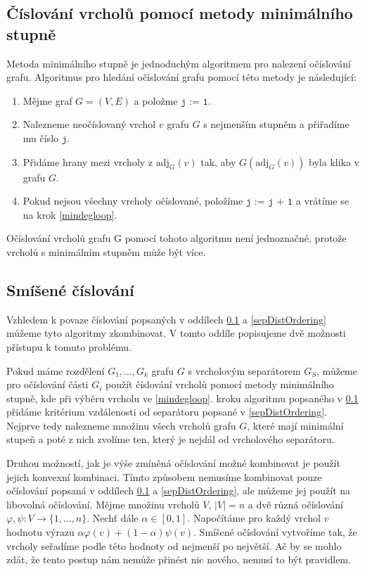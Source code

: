 \documentclass{ctuthesis}
\theoremstyle{plain}
\theoremstyle{definition}
\begin{document}
\subsection{Číslování vrcholů pomocí metody minimálního stupně}
\label{MDordering}
Metoda minimálního stupně je jednoduchým algoritmem pro nalezení očíslování grafu. Algoritmus pro hledání očíslování grafu pomocí této metody je následující:

\begin{enumerate}
  \item Mějme graf $G=(V,E)$ a položme $\texttt{j := 1}$.
  \item \label{mindegloop}
      Nalezneme neočíslovaný vrchol $v$ grafu $G$ s nejmenším stupněm a přiřadíme mu číslo $\texttt{j}$.
  \item Přidáme hrany mezi vrcholy z $\mathrm{adj}_G(v)$ tak, aby $G(\mathrm{adj}_G(v))$ byla klika v grafu $G$.
  \item Pokud nejsou všechny vrcholy očíslované, položíme $\texttt{j := j + 1}$ a vrátíme se na krok \ref{mindegloop}.
\end{enumerate}

Očíslování vrcholů grafu G pomocí tohoto algoritmu není jednoznačné, protože vrcholů s minimálním stupněm může být více.

\subsection{Smíšené číslování}
\label{Mixedordering}
Vzhledem k povaze číslování popsaných v oddílech \ref{MDordering} a \ref{sepDistOrdering} můžeme tyto algoritmy zkombinovat. V tomto oddíle popisujeme dvě možnosti přístupu k tomuto problému.

Pokud máme rozdělení $G_1, \ldots, G_k$ grafu $G$ s vrcholovým separátorem $G_S$, můžeme pro očíslování části $G_i$ použít číslování vrcholů pomocí metody minimálního stupně, kde při výběru vrcholu ve \ref{mindegloop}. kroku algoritmu popsaného v \ref{MDordering} přidáme kritérium vzdálenosti od separátoru popsané v \ref{sepDistOrdering}. Nejprve tedy nalezneme množinu všech vrcholů grafu $G$, které mají minimální stupeň a poté z nich zvolíme ten, který je nejdál od vrcholového separátoru.

Druhou možností, jak je výše zmíněná očíslování možné kombinovat je použít jejich konvexní kombinaci. Tímto způsobem nemusíme kombinovat pouze očíslování popsaná v oddílech \ref{MDordering} a \ref{sepDistOrdering}, ale můžeme jej použít na libovolná očíslování. Mějme množinu vrcholů $V$, $|V|=n$ a dvě různá očíslování $\varphi,\psi :V \rightarrow \{1,\ldots,n\}$. Nechť dále $\alpha \in [0,1]$. Napočítáme pro každý vrchol $v$ hodnotu výrazu $\alpha\varphi(v) + (1-\alpha)\psi(v)$. Smíšené očíslování vytvoříme tak, že vrcholy seřadíme podle této hodnoty od nejmenší po největší. Ač by se mohlo zdát, že tento postup nám nemůže přinést nic nového, nemusí to být pravidlem\cite{slo:89,resc:99}.
\end{document}
